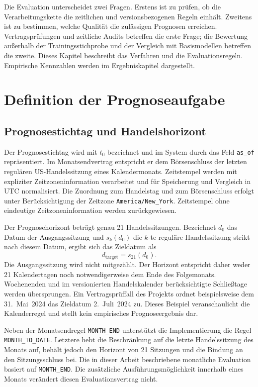 Die Evaluation unterscheidet zwei Fragen. Erstens ist zu prüfen, ob die Verarbeitungskette die zeitlichen und versionsbezogenen Regeln einhält. Zweitens ist zu bestimmen, welche Qualität die zulässigen Prognosen erreichen. Vertragsprüfungen und zeitliche Audits betreffen die erste Frage; die Bewertung außerhalb der Trainingsstichprobe und der Vergleich mit Basismodellen betreffen die zweite. Dieses Kapitel beschreibt das Verfahren und die Evaluationsregeln. Empirische Kennzahlen werden im Ergebniskapitel dargestellt.

\section{Definition der Prognoseaufgabe}
\label{sec:forecast-problem}
\subsection{Prognosestichtag und Handelshorizont}
Der Prognosestichtag wird mit $t_0$ bezeichnet und im System durch das Feld \texttt{as\_of} repräsentiert. Im Monatsendvertrag entspricht er dem Börsenschluss der letzten regulären US-Handelssitzung eines Kalendermonats. Zeitstempel werden mit expliziter Zeitzoneninformation verarbeitet und für Speicherung und Vergleich in UTC normalisiert. Die Zuordnung zum Handelstag und zum Börsenschluss erfolgt unter Berücksichtigung der Zeitzone \texttt{America/New\_York}. Zeitstempel ohne eindeutige Zeitzoneninformation werden zurückgewiesen.

Der Prognosehorizont beträgt genau 21 Handelssitzungen. Bezeichnet $d_0$ das Datum der Ausgangssitzung und $s_k(d_0)$ die $k$-te reguläre Handelssitzung strikt nach diesem Datum, ergibt sich das Zieldatum als
\begin{equation}
 d_{\mathrm{target}}=s_{21}(d_0).
 \label{eq:target-session}
\end{equation}
Die Ausgangssitzung wird nicht mitgezählt. Der Horizont entspricht daher weder 21 Kalendertagen noch notwendigerweise dem Ende des Folgemonats. Wochenenden und im versionierten Handelskalender berücksichtigte Schließtage werden übersprungen. Ein Vertragsprüffall des Projekts ordnet beispielsweise dem 31.~Mai~2024 das Zieldatum 2.~Juli~2024 zu. Dieses Beispiel veranschaulicht die Kalenderregel und stellt kein empirisches Prognoseergebnis dar.

Neben der Monatsendregel \texttt{MONTH\_END} unterstützt die Implementierung die Regel \texttt{MONTH\_TO\_DATE}. Letztere hebt die Beschränkung auf die letzte Handelssitzung des Monats auf, behält jedoch den Horizont von 21 Sitzungen und die Bindung an den Sitzungsschluss bei. Die in dieser Arbeit beschriebene monatliche Evaluation basiert auf \texttt{MONTH\_END}. Die zusätzliche Ausführungsmöglichkeit innerhalb eines Monats verändert diesen Evaluationsvertrag nicht.

